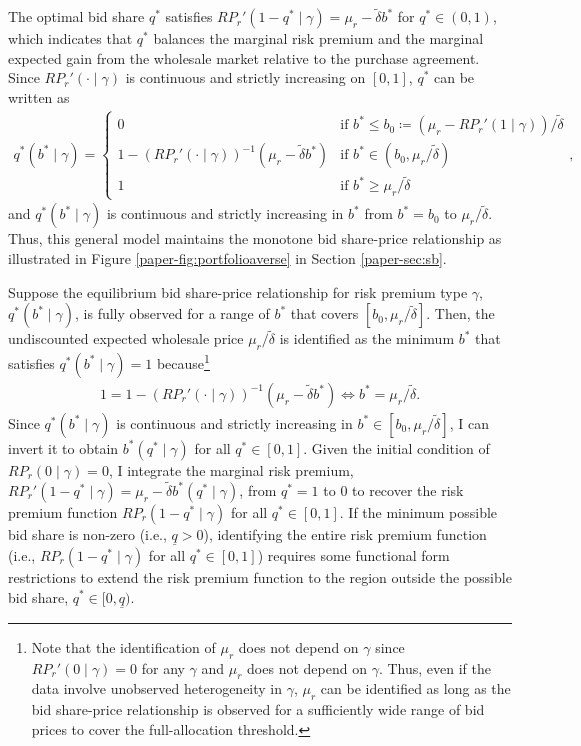 \documentclass[12pt]{article}
\theoremstyle{definition} %
\begin{document}
The optimal bid share $q^\ast$ satisfies $RP_r'(1-q^\ast \mid \gamma) = \mu_r - \tilde{\delta} b^\ast$ for $q^\ast \in (0,1) $, which indicates that $q^\ast$ balances the marginal risk premium and the marginal expected gain from the wholesale market relative to the purchase agreement. Since $RP_r'(\cdot \mid \gamma)$ is continuous and strictly increasing on $[0,1]$, $q^\ast$ can be written as
\begin{align*}
q^\ast(b^\ast \mid \gamma) = 
\begin{cases}
0 & \text{if } b^\ast \leq b_0 \coloneqq (\mu_r - RP_r'(1 \mid \gamma))/\tilde{\delta} \\
1 - (RP_r'(\cdot \mid \gamma))^{-1}(\mu_r-\tilde{\delta} b^\ast) & \text{if } b^\ast \in (b_0, \mu_r/\tilde{\delta}) \\
1 & \text{if } b^\ast \geq \mu_r/\tilde{\delta}
\end{cases},
\end{align*}
and $q^\ast(b^\ast \mid \gamma)$ is continuous and strictly increasing in $b^\ast$ from $b^\ast = b_0$ to $\mu_r/\tilde{\delta}$. Thus, this general model maintains the monotone bid share-price relationship as illustrated in Figure \ref{paper-fig:portfolioaverse} in Section \ref{paper-sec:sb}.

Suppose the equilibrium bid share-price relationship for risk premium type $\gamma$, $q^\ast(b^\ast \mid \gamma) $, is fully observed for a range of $b^\ast$ that covers $[b_0,\mu_r/\tilde{\delta}] $. Then, the undiscounted expected wholesale price $\mu_r/\tilde{\delta} $ is identified as the minimum $b^\ast$ that satisfies $q^\ast(b^\ast \mid \gamma) = 1 $ because\footnote{
Note that the identification of $\mu_r $ does not depend on $\gamma$ since $RP_r'(0 \mid \gamma) = 0 $ for any $\gamma$ and $\mu_r$ does not depend on $\gamma$. Thus, even if the data involve unobserved heterogeneity in $\gamma$, $\mu_r$ can be identified as long as the bid share-price relationship is observed for a sufficiently wide range of bid prices to cover the full-allocation threshold.
}
\begin{align*}
1 = 1 - (RP_r'(\cdot \mid \gamma))^{-1}(\mu_r-\tilde{\delta} b^\ast) \iff b^\ast = \mu_r/\tilde{\delta}.
\end{align*}
Since $q^\ast(b^\ast \mid \gamma)$ is continuous and strictly increasing in $b^\ast \in [b_0,\mu_r/\tilde{\delta}] $, I can invert it to obtain $b^\ast(q^\ast \mid \gamma) $ for all $q^\ast \in [0,1] $. Given the initial condition of $RP_r(0 \mid \gamma) = 0 $, I integrate the marginal risk premium, $RP_r'(1-q^\ast \mid \gamma) = \mu_r-\tilde{\delta} b^\ast(q^\ast \mid \gamma)$, from $q^\ast = 1 $ to $0$ to recover the risk premium function $RP_r(1-q^\ast \mid \gamma) $ for all $q^\ast \in [0,1] $. If the minimum possible bid share is non-zero (i.e., $\underline{q} > 0 $), identifying the entire risk premium function (i.e., $RP_r(1-q^\ast \mid \gamma) $ for all $q^\ast \in [0,1] $) requires some functional form restrictions to extend the risk premium function to the region outside the possible bid share, $q^\ast \in [0,\underline{q}) $.
\end{document}
